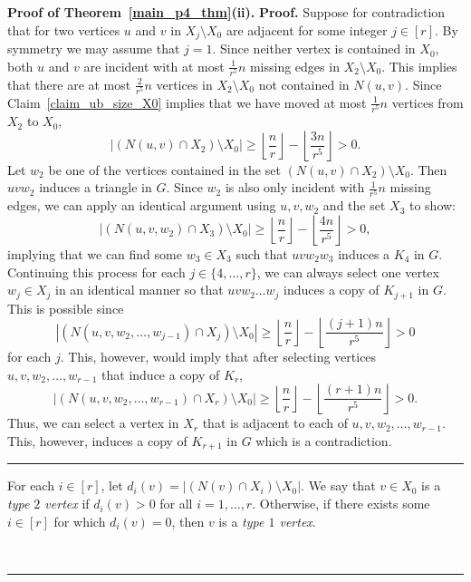 \documentclass[12pt]{article}
\renewenvironment{proof}[1][Proof]{\textbf{#1.} }{\ \rule{0.5em}{0.5em}}
\begin{document}
\begin{proof}[Proof of Theorem~\ref{main_p4_thm}(ii)]
\begin{proof}
Suppose for contradiction that for two vertices $u$ and $v$ in $X_j \setminus X_0$ are adjacent for some integer $j \in [r]$. By symmetry we may assume that $j = 1$. Since neither vertex is contained in $X_0$, both $u$ and $v$ are incident with at most $\frac{1}{r^5}n$ missing edges in $X_2 \setminus X_0$. This implies that there are at most $\frac{2}{r^5}n$ vertices in $X_2 \setminus X_0$ not contained in $N(u,v)$. Since Claim~\ref{claim_ub_size_X0} implies that we have moved at most $\frac{1}{r^5}n$ vertices from $X_2$ to $X_0$,
\[ 
| (N(u,v) \cap X_2) \setminus X_0 | \geq \left\lfloor\frac{n}{r}\right\rfloor - \left\lfloor\frac{3n}{r^5}\right\rfloor > 0.
\]
Let $w_2$ be one of the vertices contained in the set $(N(u,v) \cap X_2) \setminus X_0$. Then $uvw_2$ induces a triangle in $G$. Since $w_2$ is also only incident with $\frac{1}{r^5} n$ missing edges, we can apply an identical argument using $u,v,w_2$ and the set $X_3$ to show:
\[ 
| (N(u,v,w_2) \cap X_3) \setminus X_0 | \geq \left\lfloor\frac{n}{r}\right\rfloor - \left\lfloor\frac{4n}{r^5}\right\rfloor  > 0
,\]
implying that we can find some $w_3 \in X_3$ such that $uvw_2w_3$ induces a $K_4$ in $G$. Continuing this process for each $j \in \{4,\dots,r\}$, we can always select one vertex $w_j \in X_j$ in an identical manner so that $uvw_2\dots w_j$ induces a copy of $K_{j+1}$ in $G$. This is possible since 
\[ 
| (N(u,v,w_2,\dots,w_{j-1}) \cap X_j) \setminus X_0 | \geq \left\lfloor\frac{n}{r}\right\rfloor - \left\lfloor\frac{(j+1)n}{r^5}\right\rfloor > 0
\]
for each $j$. This, however, would imply that after selecting vertices $u,v,w_2,\dots,w_{r-1}$ that induce a copy of $K_r$,  
\[ 
| (N(u,v,w_2,\dots,w_{r-1}) \cap X_r) \setminus X_0 | \geq \left\lfloor\frac{n}{r}\right\rfloor - \left\lfloor\frac{(r+1)n}{r^5}\right\rfloor > 0. 
\]
Thus, we can select a vertex in $X_r$ that is adjacent to each of $u,v,w_2,\dots,w_{r-1}$. This, however, induces a copy of $K_{r+1}$ in $G$ which is a contradiction.
\end{proof}

For each $i \in [r]$, let $d_i(v) = | (N(v) \cap X_i)\setminus X_0 |$. 
We say that $v \in X_0$ is a \emph{type $2$ vertex} if $d_i(v) > 0$ for all $i = 1,\dots,r$. Otherwise, if there exists some $i \in [r]$ for which $d_i(v) = 0$, then $v$ is a \emph{type $1$ vertex}.


\end{proof}
\end{document}
